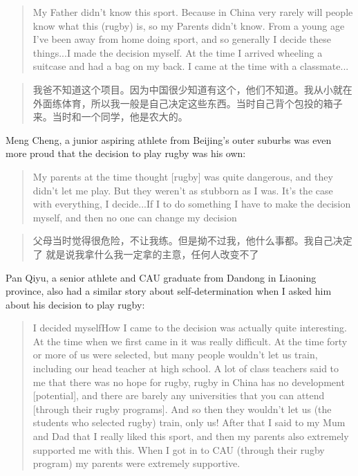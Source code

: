 \begin{CJK}{UTF8}{gbsn}
  \begin{quotation}
    My Father didn't know this sport.  Because in China very rarely will people know what this (rugby) is, so my Parents didn't know. From a young age I've been away from home doing sport, and so generally I decide these things...I made the decision myself.  At the time I arrived wheeling a suitcase and had a bag on my back.  I came at the time with a classmate...
  \end{quotation}

  \begin{quotation}
    我爸不知道这个项目。因为中国很少知道有这个，他们不知道。我从小就在外面练体育，所以我一般是自己决定这些东西。当时自己背个包投的箱子来。当时和一个同学，他是农大的。
  \end{quotation}

Meng Cheng, a junior aspiring athlete from Beijing's outer suburbs was even more proud that the decision to play rugby was his own:

  \begin{quotation}
    My parents at the time thought [rugby] was quite dangerous, and they didn't let me play.  But they weren't as stubborn as I was.  It's the case with everything, I decide...If I to do something I have to make the decision myself, and then no one can change my decision\textellipsis
  \end{quotation}

  \begin{quotation}
    父母当时觉得很危险，不让我练。但是拗不过我，他什么事都。我自己决定了\textellipsis
    就是说我拿什么我一定拿的主意，任何人改变不了\textellipsis
  \end{quotation}


  Pan Qiyu, a senior athlete and CAU graduate from Dandong in Liaoning province, also had a similar story about self-determination when I asked him about his decision to play rugby:

    \begin{quotation}
      I decided myself\textellipsis How I came to the decision was actually quite interesting.  At the time when we first came in it was really difficult.  At the time forty or more of us were selected, but many people wouldn't let us train, including our head teacher at high school.  A lot of class teachers said to me that there was no hope for rugby, rugby in China has no development [potential], and there are barely any universities that you can attend [through their rugby programs].  And so then they wouldn't let us (the students who selected rugby) train, only us! After that I said to my Mum and Dad that I really liked this sport, and then my parents also extremely supported me with this.  When I got in to CAU (through their rugby program) my parents were extremely supportive.
    \end{quotation}


\end{CJK}
